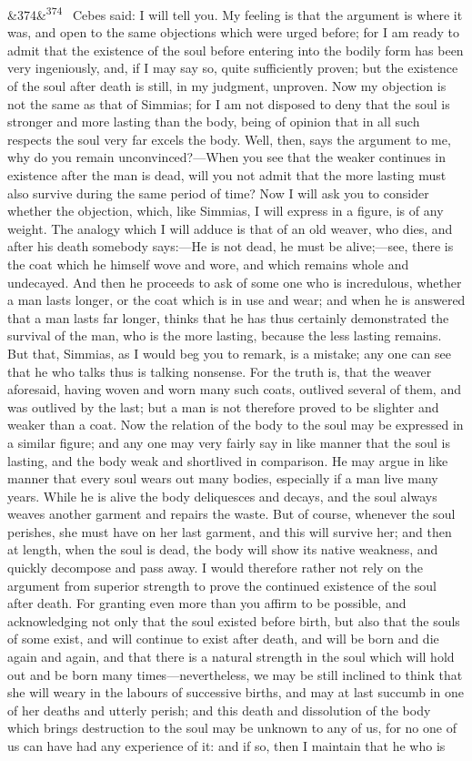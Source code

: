 \documentclass[12pt]{article}
\newcommand{\para}[1][]{\par\noindent\ifx&#1&\else\textsuperscript{\footnotesize #1}~\fi}
\begin{document}
\para[374] Cebes said: I will tell you. My feeling is that the argument is where it was, and open to the same objections which were urged before; for I am ready to admit that the existence of the soul before entering into the bodily form has been very ingeniously, and, if I may say so, quite sufficiently proven; but the existence of the soul after death is still, in my judgment, unproven. Now my objection is not the same as that of Simmias; for I am not disposed to deny that the soul is stronger and more lasting than the body, being of opinion that in all such respects the soul very far excels the body. Well, then, says the argument to me, why do you remain unconvinced?---When you see that the weaker continues in existence after the man is dead, will you not admit that the more lasting must also survive during the same period of time? Now I will ask you to consider whether the objection, which, like Simmias, I will express in a figure, is of any weight. The analogy which I will adduce is that of an old weaver, who dies, and after his death somebody says:---He is not dead, he must be alive;---see, there is the coat which he himself wove and wore, and which remains whole and undecayed. And then he proceeds to ask of some one who is incredulous, whether a man lasts longer, or the coat which is in use and wear; and when he is answered that a man lasts far longer, thinks that he has thus certainly demonstrated the survival of the man, who is the more lasting, because the less lasting remains. But that, Simmias, as I would beg you to remark, is a mistake; any one can see that he who talks thus is talking nonsense. For the truth is, that the weaver aforesaid, having woven and worn many such coats, outlived several of them, and was outlived by the last; but a man is not therefore proved to be slighter and weaker than a coat. Now the relation of the body to the soul may be expressed in a similar figure; and any one may very fairly say in like manner that the soul is lasting, and the body weak and shortlived in comparison. He may argue in like manner that every soul wears out many bodies, especially if a man live many years. While he is alive the body deliquesces and decays, and the soul always weaves another garment and repairs the waste. But of course, whenever the soul perishes, she must have on her last garment, and this will survive her; and then at length, when the soul is dead, the body will show its native weakness, and quickly decompose and pass away. I would therefore rather not rely on the argument from superior strength to prove the continued existence of the soul after death. For granting even more than you affirm to be possible, and acknowledging not only that the soul existed before birth, but also that the souls of some exist, and will continue to exist after death, and will be born and die again and again, and that there is a natural strength in the soul which will hold out and be born many times---nevertheless, we may be still inclined to think that she will weary in the labours of successive births, and may at last succumb in one of her deaths and utterly perish; and this death and dissolution of the body which brings destruction to the soul may be unknown to any of us, for no one of us can have had any experience of it: and if so, then I maintain that he who is 
\end{document}
